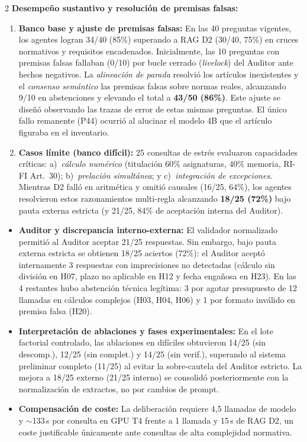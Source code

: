 \documentclass[10pt,a4paper]{article}
\newcommand{\seccion}[1]{\par\vspace{0.7pt}\nopagebreak{\color{azul}\bfseries\small #1}\par\vspace{0.1pt}\nopagebreak}
\begin{document}
\begin{multicols}{2}
\textbf{Desempeño sustantivo y resolución de premisas falsas:}
\begin{enumerate}
  \item \textbf{Banco base y ajuste de premisas falsas:} En las 40 preguntas vigentes, los agentes logran 34/40 (85\%) superando a RAG D2 (30/40, 75\%) en cruces normativos y requisitos encadenados. Inicialmente, las 10 preguntas con premisas falsas fallaban (0/10) por bucle cerrado (\textit{livelock}) del Auditor ante hechos negativos. La \textit{alineación de parada} resolvió los artículos inexistentes y el \textit{consenso semántico} las premisas falsas sobre normas reales, alcanzando 9/10 en abstenciones y elevando el total a \textbf{43/50 (86\%)}. Este ajuste se diseñó observando las trazas de error de estas mismas preguntas. El único fallo remanente (P44) ocurrió al alucinar el modelo 4B que el artículo figuraba en el inventario.
  \item \textbf{Casos límite (banco difícil):} 25 consultas de estrés evaluaron capacidades críticas: a)~\textit{cálculo numérico} (titulación 60\% asignaturas, 40\% memoria, RI-FI Art.~30); b)~\textit{prelación simultánea}; y c)~\textit{integración de excepciones}. Mientras D2 falló en aritmética y omitió causales (16/25, 64\%), los agentes resolvieron estos razonamientos multi-regla alcanzando \textbf{18/25 (72\%)} bajo pauta externa estricta (y 21/25, 84\% de aceptación interna del Auditor).
\end{enumerate}

\seccion{5. Diagnóstico de fallos, verificación y coste}
\begin{itemize}
  \item \textbf{Auditor y discrepancia interno-externa:} El validador normalizado permitió al Auditor aceptar 21/25 respuestas. Sin embargo, bajo pauta externa estricta se obtienen 18/25 aciertos (72\%): el Auditor aceptó internamente 3 respuestas con imprecisiones no detectadas (cálculo sin división en H07, plazo no aplicable en H12 y fecha engañosa en H23). En las 4 restantes hubo abstención técnica legítima: 3 por agotar presupuesto de 12 llamadas en cálculos complejos (H03, H04, H06) y 1 por formato inválido en premisa falsa (H20).
  \item \textbf{Interpretación de ablaciones y fases experimentales:} En el lote factorial controlado, las ablaciones en difíciles obtuvieron 14/25 (sin descomp.), 12/25 (sin complet.) y 14/25 (sin verif.), superando al sistema preliminar completo (11/25) al evitar la sobre-cautela del Auditor estricto. La mejora a 18/25 externo (21/25 interno) se consolidó posteriormente con la normalización de extractos, no por cambios de prompt.
  \item \textbf{Compensación de coste:} La deliberación requiere 4{,}5 llamadas de modelo y $\sim$133\,s por consulta en GPU T4 frente a 1 llamada y 15\,s de RAG D2, un coste justificable únicamente ante consultas de alta complejidad normativa.
\end{itemize}


\end{multicols}
\end{document}
